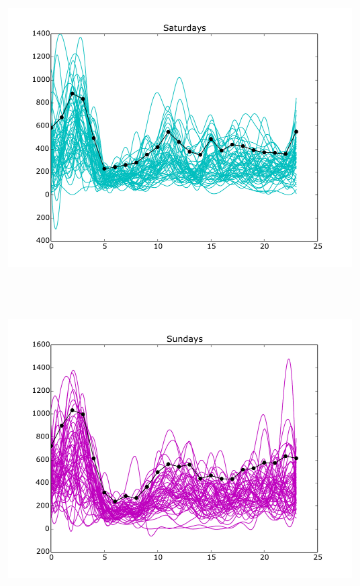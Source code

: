 \documentclass[10pt,a4paper]{amsart}
\begin{document}
\begin{figure}[h!]
    \begin{subfigure}[b]{0.5\textwidth}
        \includegraphics[width=\textwidth]
	        {Figures/Daily_trends_AC_Saturday.pdf}
    \end{subfigure}
    ~
    \begin{subfigure}[b]{0.5\textwidth}
        \includegraphics[width=\textwidth]
       		{Figures/Daily_trends_AC_Sunday.pdf}
    \end{subfigure}


\end{figure}
\end{document}
